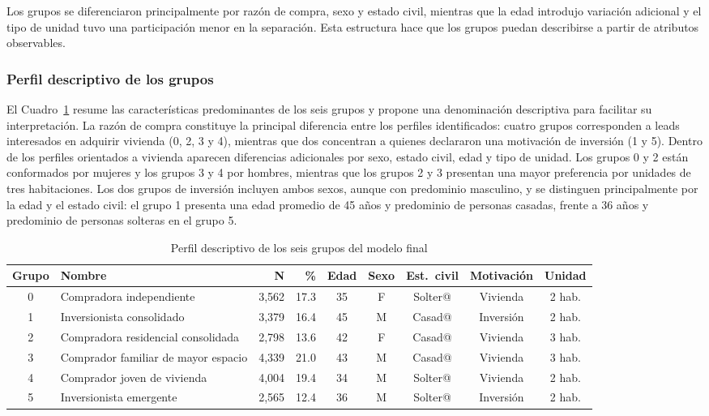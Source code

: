 Los grupos se diferenciaron principalmente por razón de compra, sexo y estado civil, mientras que la edad introdujo variación adicional y el tipo de unidad tuvo una participación menor en la separación. Esta estructura hace que los grupos puedan describirse a partir de atributos observables.

\subsubsection{Perfil descriptivo de los grupos}

El Cuadro~\ref{cuad:km-perfil-descriptivo} resume las características predominantes de los seis grupos y propone una denominación descriptiva para facilitar su interpretación. La razón de compra constituye la principal diferencia entre los perfiles identificados: cuatro grupos corresponden a leads interesados en adquirir vivienda (0, 2, 3 y 4), mientras que dos concentran a quienes declararon una motivación de inversión (1 y 5). Dentro de los perfiles orientados a vivienda aparecen diferencias adicionales por sexo, estado civil, edad y tipo de unidad. Los grupos 0 y 2 están conformados por mujeres y los grupos 3 y 4 por hombres, mientras que los grupos 2 y 3 presentan una mayor preferencia por unidades de tres habitaciones. Los dos grupos de inversión incluyen ambos sexos, aunque con predominio masculino, y se distinguen principalmente por la edad y el estado civil: el grupo 1 presenta una edad promedio de 45 años y predominio de personas casadas, frente a 36 años y predominio de personas solteras en el grupo 5.

\begin{table}[H]
\centering
\caption{Perfil descriptivo de los seis grupos del modelo final}
\label{cuad:km-perfil-descriptivo}
\small
\setlength{\tabcolsep}{4pt}
\begin{tabular}{cp{3.7cm}rrccccc}
\hline
\textbf{Grupo} & \textbf{Nombre} & \textbf{N} & \textbf{\%} & \textbf{Edad} & \textbf{Sexo} & \textbf{Est.\ civil} & \textbf{Motivación} & \textbf{Unidad} \\
\hline
0 & Compradora independiente            & 3{,}562 & 17.3 & 35 & F  & Solter@ & Vivienda  & 2 hab. \\
1 & Inversionista consolidado           & 3{,}379 & 16.4 & 45 & M  & Casad@  & Inversión & 2 hab. \\
2 & Compradora residencial consolidada  & 2{,}798 & 13.6 & 42 & F  & Casad@  & Vivienda  & 3 hab. \\
3 & Comprador familiar de mayor espacio & 4{,}339 & 21.0 & 43 & M  & Casad@  & Vivienda  & 3 hab. \\
4 & Comprador joven de vivienda         & 4{,}004 & 19.4 & 34 & M  & Solter@ & Vivienda  & 2 hab. \\
5 & Inversionista emergente             & 2{,}565 & 12.4 & 36 & M  & Solter@ & Inversión & 2 hab. \\
\hline
\end{tabular}
\fuentepropia
\end{table}

